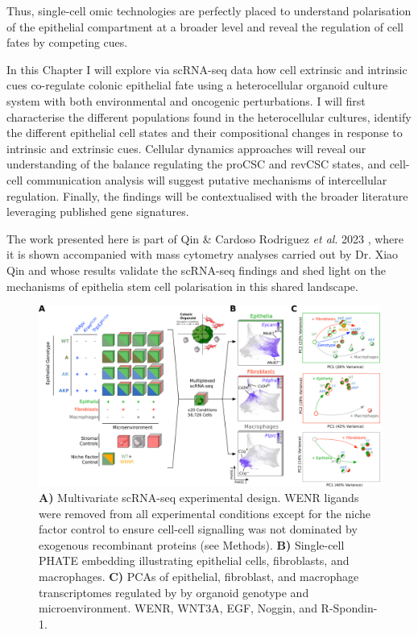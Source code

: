 
Thus, single-cell omic technologies are perfectly placed to understand polarisation of the epithelial compartment at a broader level and reveal the regulation of cell fates by competing cues.

In this Chapter I will explore via scRNA-seq data how cell extrinsic and intrinsic cues co-regulate colonic epithelial fate using a heterocellular organoid culture system with both environmental and oncogenic perturbations. I will first characterise the different populations found in the heterocellular cultures, identify the different epithelial cell states and their compositional changes in response to intrinsic and extrinsic cues. Cellular dynamics approaches will reveal our understanding of the balance regulating the proCSC and revCSC states, and cell-cell communication analysis will suggest putative mechanisms of intercellular regulation. Finally, the findings will be contextualised with the broader literature leveraging published gene signatures.

The work presented here is part of Qin \& Cardoso Rodriguez \textit{et al}. 2023 \cite{cardoso_rodriguez_single-cell_2023}, where it is shown accompanied with mass cytometry analyses carried out by Dr. Xiao Qin and whose results validate the scRNA-seq findings and shed light on the mechanisms of epithelia stem cell polarisation in this shared landscape.

\begin{figure}
    \centering
    \includegraphics{04seq/figs/4SEQ_ExpDesign.png}
    \caption{\textbf{A)} Multivariate scRNA-seq experimental design. WENR ligands were removed from all experimental conditions except for the niche factor control to ensure cell-cell signalling was not dominated by exogenous recombinant proteins (see Methods). \textbf{B)} Single-cell PHATE embedding illustrating epithelial cells, fibroblasts, and macrophages. \textbf{C)} PCAs of epithelial, fibroblast, and macrophage transcriptomes regulated by by organoid genotype and microenvironment. WENR, WNT3A, EGF, Noggin, and R-Spondin-1.}
    \label{fig:4exp}
\end{figure}

